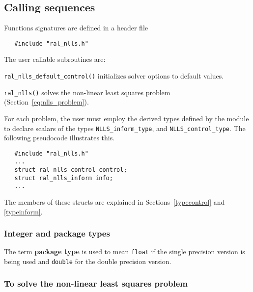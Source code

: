\documentclass{spec}
\begin{document}
\newpage
\hslhowto

\subsection{Calling sequences}

Functions signatures are defined in a header file
\begin{verbatim}
   #include "ral_nlls.h"
\end{verbatim}
\medskip

\noindent The user callable subroutines are:
\vspace{-0.1cm}
\begin{description}
   \item {\tt ral\_nlls\_default\_control()} initializes solver options to default values.
   \item {\tt ral\_nlls()}  solves the non-linear least squares problem (Section~\ref{eq:nlls_problem}).
\end{description}


\hsltypes
\label{derived types}
For each problem, the user must employ the derived types defined by the
module to declare scalars of the types {\tt NLLS\_inform\_type}, and
{\tt NLLS\_control\_type}.
The following pseudocode illustrates this.
\begin{verbatim}
   #include "ral_nlls.h"
   ...
   struct ral_nlls_control control;
   struct ral_nlls_inform info;
   ...
\end{verbatim}
The members of these structs are explained
in Sections~\ref{typecontrol} and \ref{typeinform}. 


\hslarguments

\subsubsection{Integer and package types}
The term {\bf package type} is used to mean \texttt{float}
if the single precision version is being used and
\texttt{double} for the double precision version.

\subsubsection{To solve the non-linear least squares problem}
\label{sec:factorize}
\end{document}
